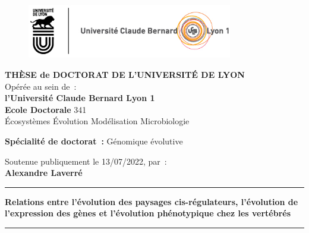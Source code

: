 \thispagestyle{empty}

\unitlength 1cm
\begin{center}
    \vspace*{-2.5cm}
    \begin{figure}[h]
        \centering
        \includegraphics[width=0.8\textwidth]{figures/Logo_Lyon_UCBL.jpg}
    \end{figure}

    {\large \textbf{THÈSE de DOCTORAT DE L'UNIVERSITÉ DE LYON}\\}
    {Opérée au sein de~:\\}
    {\large \textbf{l'Université Claude Bernard Lyon 1}\\}
    \vspace{12pt}
    {\large \textbf{Ecole Doctorale} 341 \\
    \vspace{0.15cm}
    Écosystèmes Évolution Modélisation Microbiologie
    }
    
    \vspace{12pt}
    {\large \textbf{Spécialité de doctorat~:} Génomique évolutive
    \\}
    \vspace{0.8cm}

    {Soutenue publiquement le 13/07/2022, par~:\\}
    \vspace{0.15cm}
    {\Large \textbf{Alexandre Laverré}\\}
    \vspace{0.5cm}
    \rule{5cm}{1pt}
    
    \vspace{12pt}
    {\Large \textbf{Relations entre l’évolution des paysages cis-régulateurs, l’évolution de l’expression des gènes et l’évolution phénotypique chez les vertébrés}\par}
    \vspace{12pt}
    \rule{5cm}{1pt}
    \vspace{0.5cm}

\end{center}

